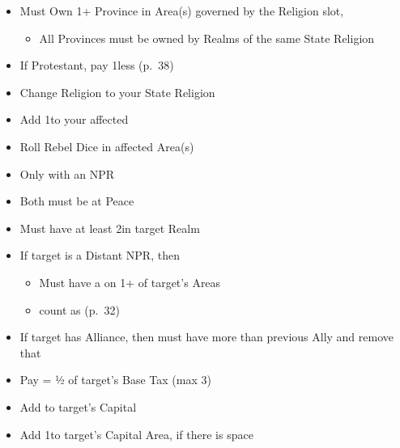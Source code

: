 \documentclass[10pt]{article}
\begin{document}
\begin{itemize}
	\item Must Own 1+ Province in Area(s) governed by the Religion slot, 
	\begin{itemize}
		\item All Provinces must be owned by Realms of the same State Religion
	\end{itemize}
	\item If Protestant, pay 1\adminpower less (p.~38)
	\item Change Religion to your State Religion
	\item Add 1\unrest to your affected \towns
	\item Roll Rebel Dice in affected Area(s)
\end{itemize}

\begin{itemize}
	\item Only with an NPR
	\item Both must be at Peace
	\item Must have at least 2\influence in target Realm
	\item If target is a Distant NPR, then 
	\begin{itemize}
		\item Must have a \claim on 1+ of target's Areas
		\item \colonists count as \influence (p.~32)
	\end{itemize}
	\item If target has Alliance, then must have more \influence than previous Ally and remove that \alliance
	\item Pay \diplopower = ½ of target's Base Tax (max 3)
	\item Add \alliance to target's Capital
	\item Add 1\influence to target's Capital Area, if there is space
\end{itemize}
\end{document}
